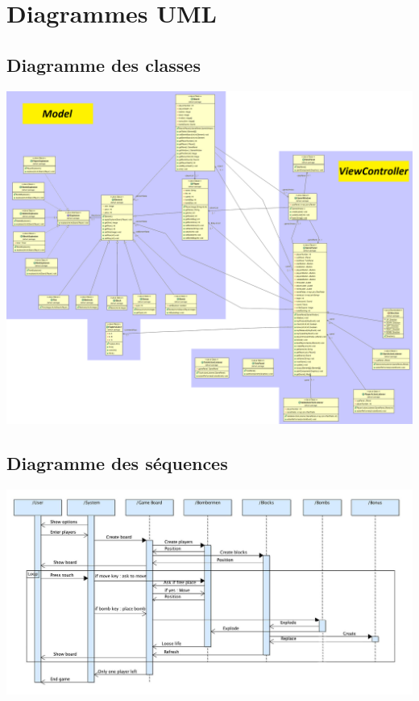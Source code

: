 \newpage
\section{Diagrammes UML}
	
	\subsection{Diagramme des classes}

	\includegraphics[scale = 0.27]{ch3/UMLfinal}
	

	
	\subsection{Diagramme des séquences}
  	\includegraphics[scale=0.25]{ch3/DiagrammeSeq}
